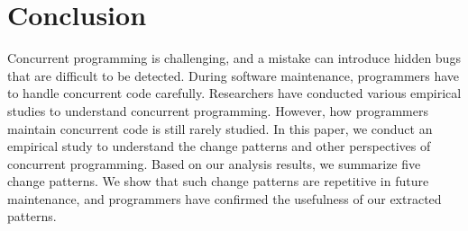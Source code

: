 \section{Conclusion}
\label{sec:conclude}
Concurrent programming is challenging, and a mistake can introduce hidden bugs that are difficult to be detected. During software maintenance, programmers have to handle concurrent code carefully. Researchers have conducted various empirical studies to understand concurrent programming. However, how programmers maintain concurrent code is still rarely studied. In this paper, we conduct an empirical study to understand the change patterns and other perspectives of concurrent programming. Based on our analysis results, we summarize five change patterns. We show that such change patterns are repetitive in future maintenance, and programmers have confirmed the usefulness of our extracted patterns.
